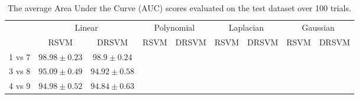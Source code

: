 \documentclass{article}
\begin{document}
\begin{table} [h] 
\centering
\caption{The average Area Under the Curve (AUC) scores
evaluated on the test dataset over 100 trials.}
\bgroup
\def\arraystretch{1.1}
\begin{tabular}{|l|cc|cc|cc|cc|}
\cline{2-9}
\multicolumn{1}{c|}{} & \multicolumn{2}{c|}{Linear} & \multicolumn{2}{c|}{Polynomial} &
\multicolumn{2}{c|}{Laplacian} & \multicolumn{2}{c|}{Gaussian} \\ 
\cline{2-9}
\multicolumn{1}{c|}{} & RSVM & DRSVM & RSVM & DRSVM & RSVM & DRSVM & RSVM & DRSVM \\ \hline 
1 vs 7& $ 98.98 \pm 0.23 $ & $ 98.9 \pm 0.24 $ \\ \hline 
3 vs 8& $ 95.09 \pm 0.49 $ & $ 94.92 \pm 0.58 $ \\ \hline 
4 vs 9& $ 94.98 \pm 0.52 $ & $ 94.84 \pm 0.63 $ \\ \hline 
 \end{tabular}
\egroup
\end{table}
\end{document}
